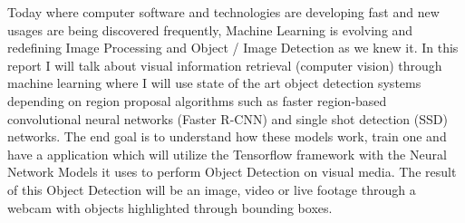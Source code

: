 
Today where computer software and technologies are developing fast and new usages are being discovered frequently, Machine
Learning is evolving and redefining Image Processing and Object / Image Detection as we knew it.
\newline
\newline
In this report I will talk about visual information retrieval (computer vision) through machine learning where I will use state of the art
object detection systems depending on region proposal algorithms such as faster region-based convolutional neural networks (Faster R-CNN)
and single shot detection (SSD) networks.
\newline
\newline
The end goal is to understand how these models work, train one and have a application which will utilize the Tensorflow framework with the
Neural Network Models it uses to perform Object Detection on visual media. The result of this Object Detection will be an image, video or
live footage through a webcam with objects highlighted through bounding boxes.

